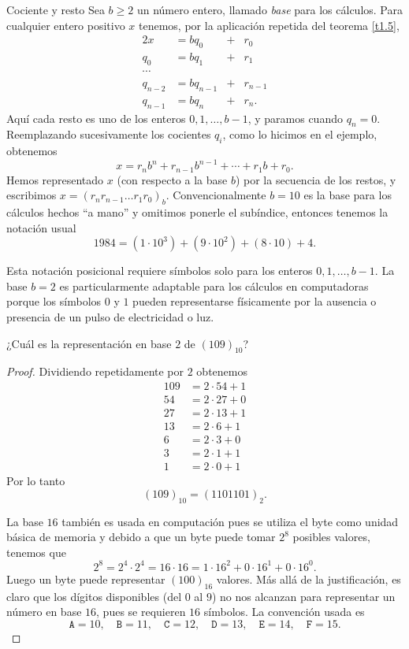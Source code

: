 \begin{section}{Cociente y resto}
Sea $b \ge 2$ un número entero, llamado \textit{base} para los cálculos.
Para cualquier entero positivo $x$ tenemos, por la aplicación
repetida del teorema \ref{t1.5},
\begin{alignat*}2
x&=bq_0 &+& r_0 \\
q_0 & = bq_1 &+&r_1 \\
\cdots & \\
q_{n-2} & = bq_{n-1} &+&r_{n-1} \\
q_{n-1} & = bq_n &+&r_n.
\end{alignat*}
Aquí cada resto es uno de los enteros $0, 1,\ldots,b-1$, y paramos
cuando $q_n=0$. Reemplazando sucesivamente los cocientes $q_i$, como lo hicimos en el ejemplo, obtenemos
$$
x=r_nb^n +r_{n-1} b^{n-1}+\cdots + r_1 b + r_0.
$$
Hemos representado $x$ (con respecto a la base $b$) por la
secuencia de los restos, y escribimos $x=(r_nr_{n-1}\dots r_1
r_0)_b$. Convencionalmente $b=10$ es la base para los cálculos
hechos ``a mano'' y omitimos ponerle el subíndice, entonces
tenemos la notación usual
$$
1984=(1\cdot 10^3 ) + (9\cdot 10^2 )+(8\cdot 10 ) + 4.
$$



Esta notación posicional requiere símbolos solo para los enteros
$0, 1,\ldots,b-1$. La base $b=2$ es particularmente adaptable para
los cálculos en computadoras porque los símbolos $0$ y $1$ pueden
representarse físicamente por la ausencia o presencia de un pulso
de electricidad o luz. 


\begin{ejemplo*} ¿Cuál es la representación en base $2$ de
$(109)_{10}$?
\end{ejemplo*}
\begin{proof} Dividiendo repetidamente por $2$ obtenemos
$$\begin{aligned}
109&=2\cdot 54+1\\ 54&=2\cdot 27+0\\ 27&=2\cdot 13+1\\ 13&=2\cdot 6+1\\
6&=2\cdot 3+0 \\ 3&=2\cdot 1+1 \\1&=2\cdot 0+1
\end{aligned}
$$
Por lo tanto
$$ (109)_{10} = (1101101)_2.
$$

La base $16$ también es usada en computación pues se utiliza el byte como unidad básica de memoria y debido a que un byte puede tomar
$2^8$ posibles valores, tenemos que $$2^8 = 2^4 \cdot 2^4 = 16 \cdot 16 = 1 \cdot 16^2 + 0 \cdot 16^1 + 0 \cdot 16^0.$$ Luego 
 un byte puede representar $(100)_{16}$ valores. Más allá de la justificación, es claro que los dígitos disponibles (del $0$  al $9$) no nos alcanzan  para representar un  número en base $16$, pues se requieren $16$ símbolos. La convención usada es 
 $$\texttt{A}=10,\quad \texttt{B}=11,\quad \texttt{C} =12,\quad \texttt{D} = 13,\quad \texttt{E} = 14,\quad \texttt{F} = 15.$$


\end{proof}
\end{section}
